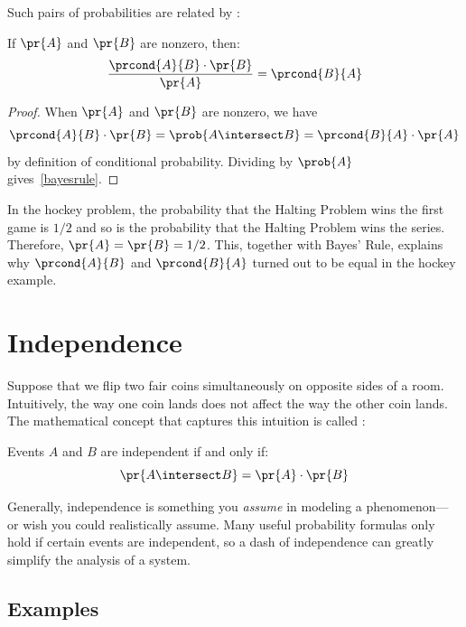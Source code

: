 Such pairs of probabilities are related by :
%
\begin{theorem}
If $\pr{A}$ and $\pr{B}$ are nonzero, then:
%
\begin{equation}\label{bayesrule}
\frac{\prcond{A}{B} \cdot \pr{B}}{\pr{A}} = \prcond{B}{A}
\end{equation}
\end{theorem}

\begin{proof}
When $\pr{A}$ and $\pr{B}$ are nonzero, we have
\[
\prcond{A}{B} \cdot \pr{B} = \prob{A \intersect B} = \prcond{B}{A} \cdot \pr{A}
\]
by definition of conditional probability.  Dividing by $\prob{A}$
gives~\eqref{bayesrule}.

\end{proof}

In the hockey problem, the probability that the Halting Problem wins the
first game is $1/2$ and so is the probability that the Halting Problem
wins the series.  Therefore, $\pr{A} = \pr{B} = 1/2$.  This, together with
Bayes' Rule, explains why $\prcond{A}{B}$ and $\prcond{B}{A}$ turned out to
be equal in the hockey example.





\section{Independence}

Suppose that we flip two fair coins simultaneously on opposite sides
of a room.  Intuitively, the way one coin lands does not affect the
way the other coin lands.  The mathematical concept that captures
this intuition is called :
\begin{definition*}
Events $A$ and $B$ are independent if and only if:
\[
\pr{A \intersect B} = \pr{A} \cdot \pr{B}
\]
\end{definition*}
Generally, independence is something you \textit{assume} in modeling a
phenomenon--- or wish you could realistically assume.  Many useful
probability formulas only hold if certain events are independent, so a
dash of independence can greatly simplify the analysis of a system.

\subsection{Examples}

